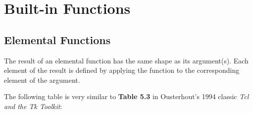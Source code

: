     \section{Built-in Functions}

  \subsection{
    \label{Elemental}Elemental Functions
  }

  \par The result of an elemental function has the same shape as its
  argument(s). Each element of the result is defined by applying the
  function to the corresponding element of the argument.
  \par The following table is very similar to 
  \textbf{Table 5.3} in Ousterhout's 1994 classic 
  \emph{Tcl and the Tk Toolkit}:

